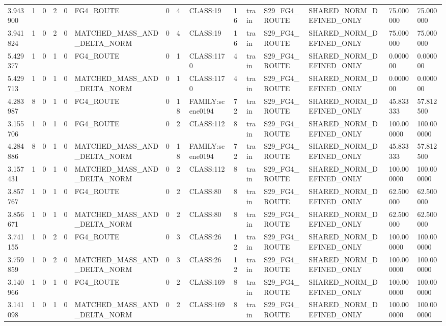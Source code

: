 \begin{tabular}{lllllllllllllll}
3.943900 & 1 & 0 & 2 & 0 & FG4\_ROUTE & 0 & 4 & CLASS:19 & 16 & train & S29\_FG4\_ROUTE & SHARED\_NORM\_DEFINED\_ONLY & 75.000000 & 75.000000 \\
3.941824 & 1 & 0 & 2 & 0 & MATCHED\_MASS\_AND\_DELTA\_NORM & 0 & 4 & CLASS:19 & 16 & train & S29\_FG4\_ROUTE & SHARED\_NORM\_DEFINED\_ONLY & 75.000000 & 75.000000 \\
5.429377 & 1 & 0 & 1 & 0 & FG4\_ROUTE & 0 & 1 & CLASS:1170 & 4 & train & S29\_FG4\_ROUTE & SHARED\_NORM\_DEFINED\_ONLY & 0.000000 & 0.000000 \\
5.429713 & 1 & 0 & 1 & 0 & MATCHED\_MASS\_AND\_DELTA\_NORM & 0 & 1 & CLASS:1170 & 4 & train & S29\_FG4\_ROUTE & SHARED\_NORM\_DEFINED\_ONLY & 0.000000 & 0.000000 \\
4.283987 & 8 & 0 & 1 & 0 & FG4\_ROUTE & 0 & 18 & FAMILY:scene0194 & 72 & train & S29\_FG4\_ROUTE & SHARED\_NORM\_DEFINED\_ONLY & 45.833333 & 57.812500 \\
3.155706 & 1 & 0 & 1 & 0 & FG4\_ROUTE & 0 & 2 & CLASS:112 & 8 & train & S29\_FG4\_ROUTE & SHARED\_NORM\_DEFINED\_ONLY & 100.000000 & 100.000000 \\
4.284886 & 8 & 0 & 1 & 0 & MATCHED\_MASS\_AND\_DELTA\_NORM & 0 & 18 & FAMILY:scene0194 & 72 & train & S29\_FG4\_ROUTE & SHARED\_NORM\_DEFINED\_ONLY & 45.833333 & 57.812500 \\
3.157431 & 1 & 0 & 1 & 0 & MATCHED\_MASS\_AND\_DELTA\_NORM & 0 & 2 & CLASS:112 & 8 & train & S29\_FG4\_ROUTE & SHARED\_NORM\_DEFINED\_ONLY & 100.000000 & 100.000000 \\
3.857767 & 1 & 0 & 1 & 0 & FG4\_ROUTE & 0 & 2 & CLASS:80 & 8 & train & S29\_FG4\_ROUTE & SHARED\_NORM\_DEFINED\_ONLY & 62.500000 & 62.500000 \\
3.856671 & 1 & 0 & 1 & 0 & MATCHED\_MASS\_AND\_DELTA\_NORM & 0 & 2 & CLASS:80 & 8 & train & S29\_FG4\_ROUTE & SHARED\_NORM\_DEFINED\_ONLY & 62.500000 & 62.500000 \\
3.741155 & 1 & 0 & 2 & 0 & FG4\_ROUTE & 0 & 3 & CLASS:26 & 12 & train & S29\_FG4\_ROUTE & SHARED\_NORM\_DEFINED\_ONLY & 100.000000 & 100.000000 \\
3.759859 & 1 & 0 & 2 & 0 & MATCHED\_MASS\_AND\_DELTA\_NORM & 0 & 3 & CLASS:26 & 12 & train & S29\_FG4\_ROUTE & SHARED\_NORM\_DEFINED\_ONLY & 100.000000 & 100.000000 \\
3.140966 & 1 & 0 & 1 & 0 & FG4\_ROUTE & 0 & 2 & CLASS:169 & 8 & train & S29\_FG4\_ROUTE & SHARED\_NORM\_DEFINED\_ONLY & 100.000000 & 100.000000 \\
3.141098 & 1 & 0 & 1 & 0 & MATCHED\_MASS\_AND\_DELTA\_NORM & 0 & 2 & CLASS:169 & 8 & train & S29\_FG4\_ROUTE & SHARED\_NORM\_DEFINED\_ONLY & 100.000000 & 100.000000 \\

\end{tabular}
